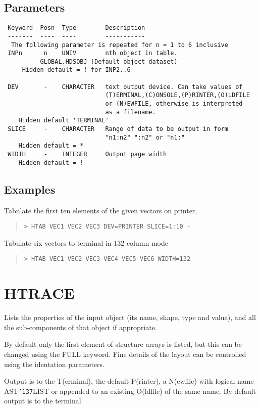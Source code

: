 \documentclass{book}
\renewcommand{\_}{{\tt\char'137}}     %
\begin{document}
\subsection{Parameters}
\begin{verbatim}
 Keyword  Posn  Type        Description
 -------  ----  ----        -----------
  The following parameter is repeated for n = 1 to 6 inclusive
 INPn      n    UNIV        nth object in table.
          GLOBAL.HDSOBJ (Default object dataset)
     Hidden default = ! for INP2..6

 DEV       -    CHARACTER   text output device. Can take values of
                            (T)ERMINAL,(C)ONSOLE,(P)RINTER,(O)LDFILE
                            or (N)EWFILE, otherwise is interpreted
                            as a filename.
    Hidden default 'TERMINAL'
 SLICE     -    CHARACTER   Range of data to be output in form
                            "n1:n2" ":n2" or "n1:"
    Hidden default = *
 WIDTH     -    INTEGER     Output page width
    Hidden default = !

\end{verbatim}\subsection{Examples}
Tabulate the first ten elements of the given vectors on printer,
\begin{quote}\begin{verbatim}
> HTAB VEC1 VEC2 VEC3 DEV=PRINTER SLICE=1:10 -
\end{verbatim}\end{quote}
Tabulate six vectors to terminal in 132 column mode
\begin{quote}\begin{verbatim}
> HTAB VEC1 VEC2 VEC3 VEC4 VEC5 VEC6 WIDTH=132
\end{verbatim}\end{quote}
\section{HTRACE}
Lists the properties of the input object (its name, shape, type
and value), and all the sub-components of that object if
appropriate.

By default only the first element of structure arrays is listed,
but this can be changed using the FULL keyword. Fine details of
the layout can be controlled using the identation parameters.

Output is to the T(erminal), the default P(rinter), a N(ewfile)
with logical name AST\_LIST or appended to an existing O(ldfile)
of the same name. By default output is to the terminal.
\end{document}
